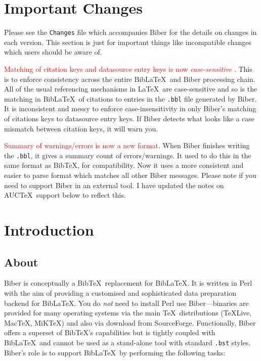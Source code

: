 \documentclass{ltxdockit}
\begin{document}
\printtitlepage
\tableofcontents

\section{Important Changes}\label{special}

Please see the \verb+Changes+ file which accompanies Biber for the
details on changes in each version. This section is just for important
things like incompatible changes which users should be aware of.

\textcolor{red}{Matching of citation keys and datasource entry
  keys is now \emph{case-sensitive}} . This is to enforce consistency
across the entire Bib\LaTeX\ and Biber processing chain.
All of the usual referencing mechanisms in \LaTeX\ are case-sensitive and
so is the matching in Bib\LaTeX\ of citations to entries in the
\texttt{.bbl} file generated by Biber. It is inconsistent and
messy to enforce case-insensitivity in only Biber's matching of
citations keys to datasource entry keys. If Biber detects what
looks like a case mismatch between citation keys, it will warn you.

\noindent \textcolor{red}{Summary of warnings/errors is now a new format}.
When Biber finishes writing the \verb+.bbl+, it gives a summary
count of errors/warnings. It used to do this in the same format as
Bib\TeX, for compatibility. Now it uses a more consistent and easier
to parse format which matches all other Biber messages. Please note
if you need to support Biber in an external tool. I have updated the
notes on AUC\TeX\ support below to reflect this.

\section{Introduction}\label{int}

\subsection{About}

Biber is conceptually a Bib\TeX\ replacement for
Bib\LaTeX. It is written in Perl with the aim of providing a
customised and sophisticated data preparation backend for Bib\LaTeX.
You do \emph{not} need to install Perl use Biber---binaries
are provided for many operating systems via the main \TeX\
distributions (\TeX Live, Mac\TeX, MiK\TeX) and also via download from SourceForge.
Functionally, Biber offers a superset of Bib\TeX's capabilities but is
tightly coupled with Bib\LaTeX\ and cannot be used as a stand-alone tool
with standard \verb+.bst+ styles. Biber's role is to support
Bib\LaTeX\ by performing the following tasks:
\end{document}
